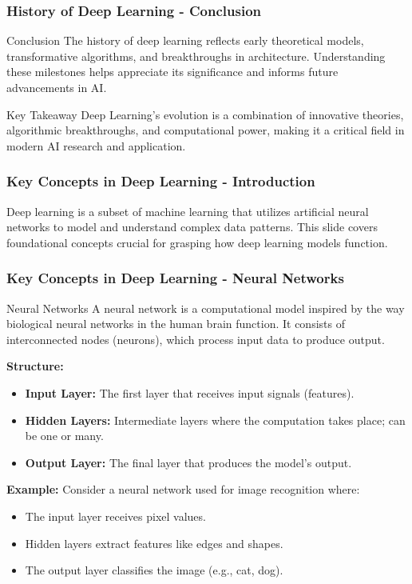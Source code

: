 \documentclass[aspectratio=169]{beamer}
\begin{document}
\begin{frame}[fragile]
    \frametitle{History of Deep Learning - Conclusion}
    \begin{block}{Conclusion}
        The history of deep learning reflects early theoretical models, transformative algorithms, and breakthroughs in architecture. Understanding these milestones helps appreciate its significance and informs future advancements in AI.
    \end{block}
    
    \begin{block}{Key Takeaway}
        Deep Learning's evolution is a combination of innovative theories, algorithmic breakthroughs, and computational power, making it a critical field in modern AI research and application.
    \end{block}
\end{frame}

\begin{frame}[fragile]
    \frametitle{Key Concepts in Deep Learning - Introduction}
    Deep learning is a subset of machine learning that utilizes artificial neural networks to model and understand complex data patterns. This slide covers foundational concepts crucial for grasping how deep learning models function.
\end{frame}

\begin{frame}[fragile]
    \frametitle{Key Concepts in Deep Learning - Neural Networks}
    \begin{block}{Neural Networks}
        A neural network is a computational model inspired by the way biological neural networks in the human brain function. It consists of interconnected nodes (neurons), which process input data to produce output.
    \end{block}

    \textbf{Structure:}
    \begin{itemize}
        \item \textbf{Input Layer:} The first layer that receives input signals (features).
        \item \textbf{Hidden Layers:} Intermediate layers where the computation takes place; can be one or many.
        \item \textbf{Output Layer:} The final layer that produces the model's output.
    \end{itemize}

    \textbf{Example:}
    Consider a neural network used for image recognition where:
    \begin{itemize}
        \item The input layer receives pixel values.
        \item Hidden layers extract features like edges and shapes.
        \item The output layer classifies the image (e.g., cat, dog).
    \end{itemize}
\end{frame}
\end{document}

